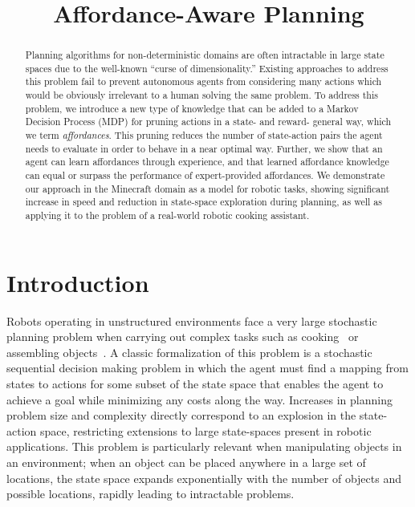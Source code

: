 \documentclass[conference]{IEEEtran}
\begin{document}
\title{Affordance-Aware Planning}

\author{
}

\maketitle

\begin{abstract}
Planning algorithms for non-deterministic domains are often
intractable in large state spaces due to the well-known ``curse of
dimensionality.''  Existing approaches to address this problem fail to
prevent autonomous agents from considering many actions which would be
obviously irrelevant to a human solving the same problem.  To address
this problem, we introduce a new type of knowledge that can be added
to a Markov Decision Process (MDP) for pruning actions in a state- and
reward- general way, which we term {\em affordances}.  This pruning
reduces the number of state-action pairs the agent needs to evaluate
in order to behave in a near optimal way.  Further, we show that an
agent can learn affordances through experience, and that learned
affordance knowledge can equal or surpass the performance of
expert-provided affordances.  We demonstrate our approach in the
Minecraft domain as a model for robotic tasks, showing significant
increase in speed and reduction in state-space exploration during
planning, as well as applying it to the problem of a real-world
robotic cooking assistant. 

\end{abstract}

\IEEEpeerreviewmaketitle

\section{Introduction}
\label{sec:introduction}

Robots operating in unstructured environments face a very large
stochastic planning problem when carrying out complex tasks such as
cooking~\citep{bollini12} or assembling objects~\citep{knepper13}.  A
classic formalization of this problem is a stochastic sequential
decision making problem in which the agent must find a mapping from
states to actions for some subset of the state space that enables the
agent to achieve a goal while minimizing any costs along the way.
Increases in planning problem size and complexity directly correspond
to an explosion in the state-action space, restricting extensions to
large state-spaces present in robotic applications.  This problem is
particularly relevant when manipulating objects in an environment;
when an object can be placed anywhere in a large set of locations, the
state space expands exponentially with the number of objects and
possible locations, rapidly leading to intractable problems.
\end{document}
